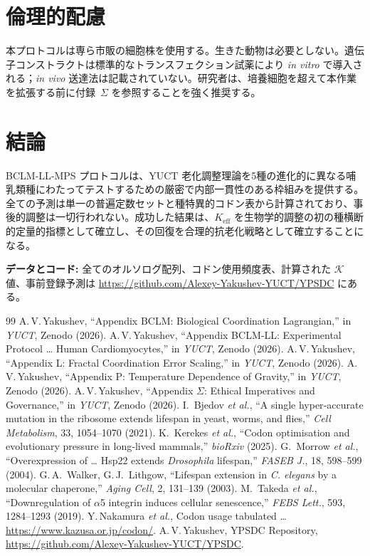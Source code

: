 \documentclass[12pt,a4paper]{ltjsarticle}
\newcommand{\REL}{\mathcal{K}}          %
\begin{document}
	\section{倫理的配慮}
	\label{sec:ethics}
	本プロトコルは専ら市販の細胞株を使用する。生きた動物は必要としない。遺伝子コンストラクトは標準的なトランスフェクション試薬により \textit{in vitro} で導入される；\textit{in vivo} 送達法は記載されていない。研究者は、培養細胞を超えて本作業を拡張する前に付録~\(\Sigma\) を参照することを強く推奨する。
	
	\section{結論}
	\label{sec:conclusion}
	BCLM‑LL‑MPS プロトコルは、YUCT 老化調整理論を5種の進化的に異なる哺乳類種にわたってテストするための厳密で内部一貫性のある枠組みを提供する。全ての予測は単一の普遍定数セットと種特異的コドン表から計算されており、事後的調整は一切行われない。成功した結果は、\(K_{\mathrm{eff}}\) を生物学的調整の初の種横断的定量的指標として確立し、その回復を合理的抗老化戦略として確立することになる。
	
	\vspace{0.5cm}
	\noindent\textbf{データとコード:} 全てのオルソログ配列、コドン使用頻度表、計算された \(\REL\) 値、事前登録予測は \url{https://github.com/Alexey-Yakushev-YUCT/YPSDC} にある。
	
	\begin{thebibliography}{99}
		 A.\,V.\,Yakushev, ``Appendix BCLM: Biological Coordination Lagrangian,'' in \emph{YUCT}, Zenodo (2026).
		 A.\,V.\,Yakushev, ``Appendix BCLM‑LL: Experimental Protocol … Human Cardiomyocytes,'' in \emph{YUCT}, Zenodo (2026).
		 A.\,V.\,Yakushev, ``Appendix L: Fractal Coordination Error Scaling,'' in \emph{YUCT}, Zenodo (2026).
		 A.\,V.\,Yakushev, ``Appendix P: Temperature Dependence of Gravity,'' in \emph{YUCT}, Zenodo (2026).
		 A.\,V.\,Yakushev, ``Appendix \(\Sigma\): Ethical Imperatives and Governance,'' in \emph{YUCT}, Zenodo (2026).
		 I.~Bjedov \emph{et al.}, ``A single hyper‑accurate mutation in the ribosome extends lifespan in yeast, worms, and flies,'' \emph{Cell Metabolism}, 33, 1054–1070 (2021).
		 K.~Kerekes \emph{et al.}, ``Codon optimisation and evolutionary pressure in long‑lived mammals,'' \emph{bioRxiv} (2025).
		 G.~Morrow \emph{et al.}, ``Overexpression of … Hsp22 extends \textit{Drosophila} lifespan,'' \emph{FASEB J.}, 18, 598–599 (2004).
		 G.\,A.~Walker, G.\,J.~Lithgow, ``Lifespan extension in \textit{C. elegans} by a molecular chaperone,'' \emph{Aging Cell}, 2, 131–139 (2003).
		 M.~Takeda \emph{et al.}, ``Downregulation of \(\alpha\)5 integrin induces cellular senescence,'' \emph{FEBS Lett.}, 593, 1284–1293 (2019).
		 Y.\,Nakamura \emph{et al.}, Codon usage tabulated … \url{https://www.kazusa.or.jp/codon/}.
		 A.\,V.\,Yakushev, YPSDC Repository, \url{https://github.com/Alexey-Yakushev-YUCT/YPSDC}.
	\end{thebibliography}
	
\end{document}
